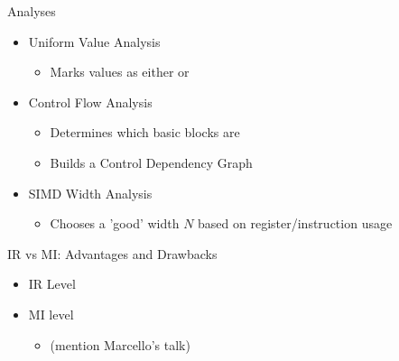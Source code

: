 
\begin{frame}{Analyses}

\begin{itemize}
    \item Uniform Value Analysis
    \begin{itemize}
        \item Marks values as either  or 
    \end{itemize}

    \item Control Flow Analysis
    \begin{itemize}
        \item Determines which basic blocks are 
        \item Builds a Control Dependency Graph
    \end{itemize}
    
    \item SIMD Width Analysis
    \begin{itemize}
        \item Chooses a 'good' width $N$ based on register/instruction usage
    \end{itemize}
\end{itemize}

\end{frame}


\begin{frame}{IR vs MI: Advantages and Drawbacks}

\begin{itemize}
    \item IR Level

    \item MI level
    \begin{itemize}
        \item (mention Marcello's talk)
    \end{itemize}
    
\end{itemize}

\end{frame}


